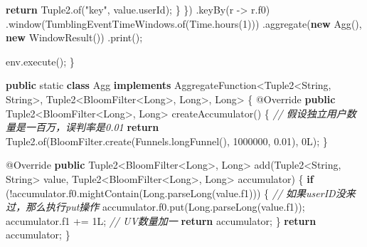 \documentclass[cn,11pt,chinese]{elegantbook}
\newenvironment{Shaded}{}{}
\newcommand{\AttributeTok}[1]{\textcolor[rgb]{0.49,0.56,0.16}{#1}}
\newcommand{\BaseNTok}[1]{\textcolor[rgb]{0.25,0.63,0.44}{#1}}
\newcommand{\BuiltInTok}[1]{#1}
\newcommand{\CommentTok}[1]{\textcolor[rgb]{0.38,0.63,0.69}{\textit{#1}}}
\newcommand{\DataTypeTok}[1]{\textcolor[rgb]{0.56,0.13,0.00}{#1}}
\newcommand{\DecValTok}[1]{\textcolor[rgb]{0.25,0.63,0.44}{#1}}
\newcommand{\FloatTok}[1]{\textcolor[rgb]{0.25,0.63,0.44}{#1}}
\newcommand{\FunctionTok}[1]{\textcolor[rgb]{0.02,0.16,0.49}{#1}}
\newcommand{\KeywordTok}[1]{\textcolor[rgb]{0.00,0.44,0.13}{\textbf{#1}}}
\newcommand{\NormalTok}[1]{#1}
\newcommand{\StringTok}[1]{\textcolor[rgb]{0.25,0.44,0.63}{#1}}
\begin{document}
\begin{Shaded}
\begin{Highlighting}[]
                    \KeywordTok{return}\NormalTok{ Tuple2.}\FunctionTok{of}\NormalTok{(}\StringTok{"key"}\NormalTok{, value.}\FunctionTok{userId}\NormalTok{);}
\NormalTok{                \}}
\NormalTok{            \})}
\NormalTok{            .}\FunctionTok{keyBy}\NormalTok{(r {-}\textgreater{} r.}\FunctionTok{f0}\NormalTok{)}
\NormalTok{            .}\FunctionTok{window}\NormalTok{(TumblingEventTimeWindows.}\FunctionTok{of}\NormalTok{(}\BuiltInTok{Time}\NormalTok{.}\FunctionTok{hours}\NormalTok{(}\DecValTok{1}\NormalTok{)))}
\NormalTok{            .}\FunctionTok{aggregate}\NormalTok{(}\KeywordTok{new} \FunctionTok{Agg}\NormalTok{(), }\KeywordTok{new} \FunctionTok{WindowResult}\NormalTok{())}
\NormalTok{            .}\FunctionTok{print}\NormalTok{();}

\NormalTok{        env.}\FunctionTok{execute}\NormalTok{();}
\NormalTok{    \}}

    \KeywordTok{public} \DataTypeTok{static} \KeywordTok{class}\NormalTok{ Agg }\KeywordTok{implements}\NormalTok{ AggregateFunction\textless{}Tuple2\textless{}}\BuiltInTok{String}\NormalTok{, }\BuiltInTok{String}\NormalTok{\textgreater{}, Tuple2\textless{}BloomFilter\textless{}}\BuiltInTok{Long}\NormalTok{\textgreater{}, }\BuiltInTok{Long}\NormalTok{\textgreater{}, }\BuiltInTok{Long}\NormalTok{\textgreater{} \{}
        \AttributeTok{@Override}
        \KeywordTok{public}\NormalTok{ Tuple2\textless{}BloomFilter\textless{}}\BuiltInTok{Long}\NormalTok{\textgreater{}, }\BuiltInTok{Long}\NormalTok{\textgreater{} }\FunctionTok{createAccumulator}\NormalTok{() \{}
            \CommentTok{// 假设独立用户数量是一百万，误判率是0.01}
            \KeywordTok{return}\NormalTok{ Tuple2.}\FunctionTok{of}\NormalTok{(BloomFilter.}\FunctionTok{create}\NormalTok{(Funnels.}\FunctionTok{longFunnel}\NormalTok{(), }\DecValTok{1000000}\NormalTok{, }\FloatTok{0.}\BaseNTok{01}\NormalTok{), }\DecValTok{0L}\NormalTok{);}
\NormalTok{        \}}

        \AttributeTok{@Override}
        \KeywordTok{public}\NormalTok{ Tuple2\textless{}BloomFilter\textless{}}\BuiltInTok{Long}\NormalTok{\textgreater{}, }\BuiltInTok{Long}\NormalTok{\textgreater{} }\FunctionTok{add}\NormalTok{(Tuple2\textless{}}\BuiltInTok{String}\NormalTok{, }\BuiltInTok{String}\NormalTok{\textgreater{} value, Tuple2\textless{}BloomFilter\textless{}}\BuiltInTok{Long}\NormalTok{\textgreater{}, }\BuiltInTok{Long}\NormalTok{\textgreater{} accumulator) \{}
            \KeywordTok{if}\NormalTok{ (!accumulator.}\FunctionTok{f0}\NormalTok{.}\FunctionTok{mightContain}\NormalTok{(}\BuiltInTok{Long}\NormalTok{.}\FunctionTok{parseLong}\NormalTok{(value.}\FunctionTok{f1}\NormalTok{))) \{}
                \CommentTok{// 如果userID没来过，那么执行put操作}
\NormalTok{                accumulator.}\FunctionTok{f0}\NormalTok{.}\FunctionTok{put}\NormalTok{(}\BuiltInTok{Long}\NormalTok{.}\FunctionTok{parseLong}\NormalTok{(value.}\FunctionTok{f1}\NormalTok{));}
\NormalTok{                accumulator.}\FunctionTok{f1}\NormalTok{ += }\DecValTok{1L}\NormalTok{; }\CommentTok{// UV数量加一}
                \KeywordTok{return}\NormalTok{ accumulator;}
\NormalTok{            \}}
            \KeywordTok{return}\NormalTok{ accumulator;}
\NormalTok{        \}}


\end{Highlighting}
\end{Shaded}
\end{document}
